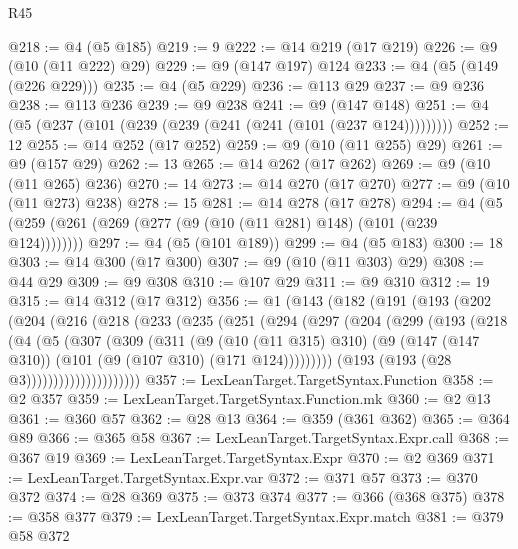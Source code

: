 \begin{lexlean}{R45}
\begin{coremodule}
@218 := @4 (@5 @185)
@219 := 9
@222 := @14 @219 (@17 @219)
@226 := @9 (@10 (@11 @222) @29)
@229 := @9 (@147 @197) @124
@233 := @4 (@5 (@149 (@226 @229)))
@235 := @4 (@5 @229)
@236 := @113 @29
@237 := @9 @236
@238 := @113 @236
@239 := @9 @238
@241 := @9 (@147 @148)
@251 := @4 (@5 (@237 (@101 (@239 (@239 (@241 (@241 (@101 (@237 @124)))))))))
@252 := 12
@255 := @14 @252 (@17 @252)
@259 := @9 (@10 (@11 @255) @29)
@261 := @9 (@157 @29)
@262 := 13
@265 := @14 @262 (@17 @262)
@269 := @9 (@10 (@11 @265) @236)
@270 := 14
@273 := @14 @270 (@17 @270)
@277 := @9 (@10 (@11 @273) @238)
@278 := 15
@281 := @14 @278 (@17 @278)
@294 := @4 (@5 (@259 (@261 (@269 (@277 (@9 (@10 (@11 @281) @148) (@101 (@239 @124))))))))
@297 := @4 (@5 (@101 @189))
@299 := @4 (@5 @183)
@300 := 18
@303 := @14 @300 (@17 @300)
@307 := @9 (@10 (@11 @303) @29)
@308 := @44 @29
@309 := @9 @308
@310 := @107 @29
@311 := @9 @310
@312 := 19
@315 := @14 @312 (@17 @312)
@356 := @1
    (@143
      (@182
        (@191
          (@193
            (@202
              (@204
                (@216
                  (@218
                    (@233
                      (@235
                        (@251
                          (@294
                            (@297
                              (@204
                                (@299
                                  (@193
                                    (@218
                                      (@4
                                        (@5
                                          (@307
                                            (@309
                                              (@311
                                                (@9
                                                  (@10 (@11 @315) @310)
                                                  (@9
                                                    (@147 (@147 @310))
                                                    (@101 (@9 (@107 @310) (@171 @124)))))))))
                                        (@193 (@193 (@28 @3)))))))))))))))))))))
@357 := LexLeanTarget.TargetSyntax.Function
@358 := @2 @357
@359 := LexLeanTarget.TargetSyntax.Function.mk
@360 := @2 @13
@361 := @360 @57
@362 := @28 @13
@364 := @359 (@361 @362)
@365 := @364 @89
@366 := @365 @58
@367 := LexLeanTarget.TargetSyntax.Expr.call
@368 := @367 @19
@369 := LexLeanTarget.TargetSyntax.Expr
@370 := @2 @369
@371 := LexLeanTarget.TargetSyntax.Expr.var
@372 := @371 @57
@373 := @370 @372
@374 := @28 @369
@375 := @373 @374
@377 := @366 (@368 @375)
@378 := @358 @377
@379 := LexLeanTarget.TargetSyntax.Expr.match
@381 := @379 @58 @372

\end{coremodule}
\end{lexlean}
